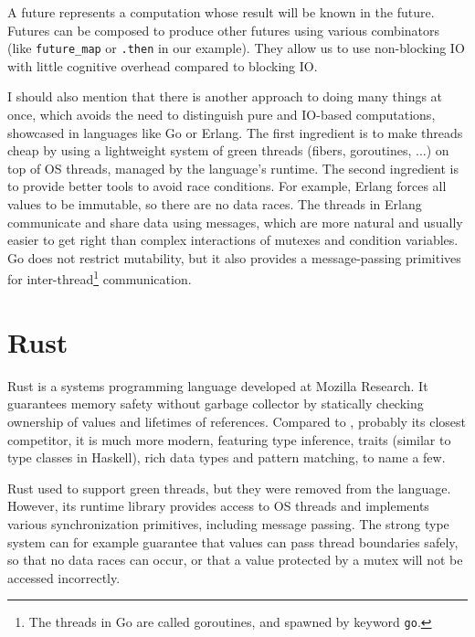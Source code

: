 
A future represents a computation whose result will be known in the future.
Futures can be composed to produce other futures using various combinators (like
\texttt{future_map} or \texttt{.then} in our example). They allow us to use
non-blocking IO with little cognitive overhead compared to blocking IO.

I should also mention that there is another approach to doing many things at
once, which avoids the need to distinguish pure and IO-based computations,
showcased in languages like Go or Erlang. The first ingredient is to make
threads cheap by using a lightweight system of green threads (fibers,
goroutines, ...) on top of OS threads, managed by the language's runtime. The
second ingredient is to provide better tools to avoid race conditions. For
example, Erlang forces all values to be immutable, so there are no data races.
The threads in Erlang communicate and share data using messages, which are more
natural and usually easier to get right than complex interactions of mutexes and
condition variables. Go does not restrict mutability, but it also provides a
message-passing primitives for inter-thread\footnote{The threads in Go are
called goroutines, and spawned by keyword \texttt{go}.} communication.

\section{Rust}

Rust \cite{rust-lang} is a systems programming language developed at Mozilla
Research. It guarantees memory safety without garbage collector by statically
checking ownership of values and lifetimes of references. Compared to
\Cplusplus, probably its closest competitor, it is much more modern, featuring
type inference, traits (similar to type classes in Haskell), rich data types and
pattern matching, to name a few.

Rust used to support green threads, but they were removed from the language.
However, its runtime library provides access to OS threads and implements
various synchronization primitives, including message passing. The strong type
system can for example guarantee that values can pass thread boundaries safely,
so that no data races can occur, or that a value protected by a mutex will not
be accessed incorrectly.

